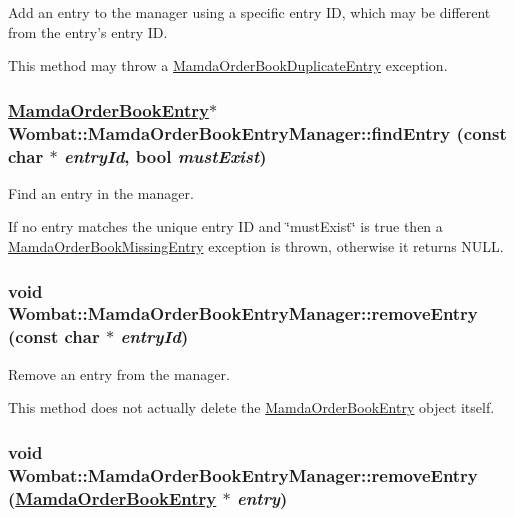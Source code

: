 Add an entry to the manager using a specific entry ID, which may be different from the entry's entry ID. 

This method may throw a \hyperlink{classWombat_1_1MamdaOrderBookDuplicateEntry}{Mamda\-Order\-Book\-Duplicate\-Entry} exception. \hypertarget{classWombat_1_1MamdaOrderBookEntryManager_e718aadca369ac8556ebc8c6f84a5c22}{
\subsubsection[findEntry]{\setlength{\rightskip}{0pt plus 5cm}\hyperlink{classWombat_1_1MamdaOrderBookEntry}{Mamda\-Order\-Book\-Entry}$\ast$ Wombat::Mamda\-Order\-Book\-Entry\-Manager::find\-Entry (const char $\ast$ {\em entry\-Id}, bool {\em must\-Exist})}}
\label{classWombat_1_1MamdaOrderBookEntryManager_e718aadca369ac8556ebc8c6f84a5c22}


Find an entry in the manager. 

If no entry matches the unique entry ID and \char`\"{}must\-Exist\char`\"{} is true then a \hyperlink{classWombat_1_1MamdaOrderBookMissingEntry}{Mamda\-Order\-Book\-Missing\-Entry} exception is thrown, otherwise it returns NULL. \hypertarget{classWombat_1_1MamdaOrderBookEntryManager_76d6e0eddbcd6c44eaf3e16402df0343}{
\subsubsection[removeEntry]{\setlength{\rightskip}{0pt plus 5cm}void Wombat::Mamda\-Order\-Book\-Entry\-Manager::remove\-Entry (const char $\ast$ {\em entry\-Id})}}
\label{classWombat_1_1MamdaOrderBookEntryManager_76d6e0eddbcd6c44eaf3e16402df0343}


Remove an entry from the manager. 

This method does not actually delete the \hyperlink{classWombat_1_1MamdaOrderBookEntry}{Mamda\-Order\-Book\-Entry} object itself. \hypertarget{classWombat_1_1MamdaOrderBookEntryManager_fe3edb292b8057ceeb7d1afe1c4a60b7}{
\subsubsection[removeEntry]{\setlength{\rightskip}{0pt plus 5cm}void Wombat::Mamda\-Order\-Book\-Entry\-Manager::remove\-Entry (\hyperlink{classWombat_1_1MamdaOrderBookEntry}{Mamda\-Order\-Book\-Entry} $\ast$ {\em entry})}}
\label{classWombat_1_1MamdaOrderBookEntryManager_fe3edb292b8057ceeb7d1afe1c4a60b7}


